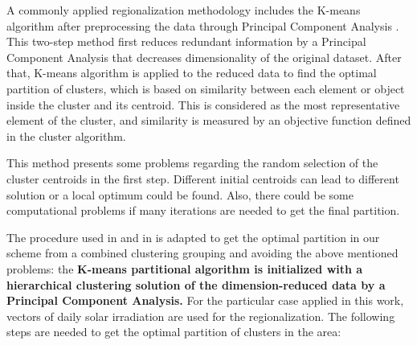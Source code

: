 
A commonly applied regionalization methodology includes the K-means algorithm after preprocessing the data through Principal Component Analysis \cite*{Ding2004}. This two-step method first reduces redundant information by a Principal Component Analysis that decreases dimensionality of the original dataset. After that, K-means algorithm is applied to the reduced data to find the optimal partition of clusters, which is based on similarity between each element or object inside the cluster and its centroid. This is considered as the most representative element of the cluster, and similarity is measured by an objective function defined in the cluster algorithm.

This method presents some problems regarding the random selection of the cluster centroids in the first step. Different initial centroids can lead to different solution or a local optimum could be found. Also, there could be some computational problems if many iterations are needed to get the final partition.

The procedure used in \cite{Argueso2011} and in \cite{Zagouras2014} is adapted to get the optimal partition in our scheme from a combined clustering grouping and avoiding the above mentioned problems: the \textbf{K-means partitional algorithm is initialized with a hierarchical clustering solution of the dimension-reduced data by a Principal Component Analysis.} For the particular case applied in this work, vectors of daily solar irradiation are used for the regionalization. The following steps are needed to get the optimal partition of clusters in the area:

